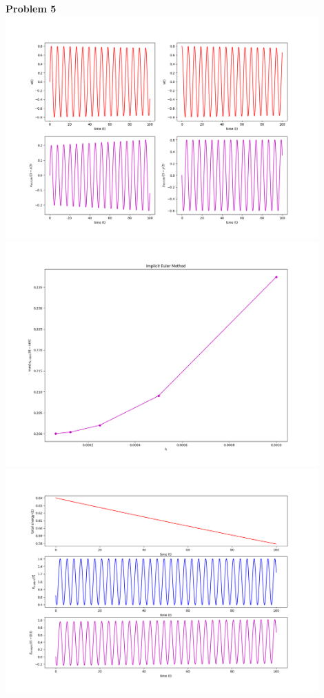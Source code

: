 \documentclass[12pt]{article}
\begin{document}
	\indent\textbf{Problem 5}\\
		\includegraphics[width=0.9\textwidth]{implicitPlot.png}\\
		\includegraphics[width=0.9\textwidth]{errorImplicitPlot.png}\\
		\includegraphics[width=0.9\textwidth]{energyImplicitPlot.png}
\end{document}
